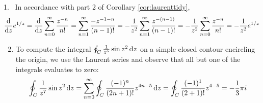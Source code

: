 \begin{examples}{}{}
\hangindent\leftmargini
\textup{1.} \ In accordance with part 2 of Corollary \ref{cor:laurenttidy},
	\[\frac{\mathrm{d} }{\mathrm{d} z}e^{1/z}=\frac{\mathrm{d} }{\mathrm{d} z}\sum_{n=0}^\infty\frac{z^{-n}}{n!} =\sum_{n=1}^\infty\frac{-z^{-1-n}}{(n-1)!} =-\frac 1{z^2}\sum_{n=1}^\infty\frac{z^{-(n-1)}}{(n-1)!} =-\frac 1{z^2}\sum_{n=0}^\infty\frac{z^{-n}}{n!} =-\frac 1{z^2}e^{1/z}\]
\begin{enumerate}\setcounter{enumi}{1}
	\item To compute the integral $\oint_C\frac 1{z^5}\sin z^2\,{\mathrm{d} z}$ on a simple closed contour encircling the origin, we use the Laurent series and observe that all but one of the integrals evaluates to zero:
	\[\oint_C\frac 1{z^7}\sin z^2\,{\mathrm{d} z} =\sum_{n=0}^\infty\oint_C\frac{(-1)^n}{(2n+1)!}z^{4n-5}\,{\mathrm{d} z} =\oint_C\frac{(-1)^1}{(2+1)!}z^{4-5} =-\frac 13\pi i\]
\end{enumerate}
\end{examples}
\goodbreak

